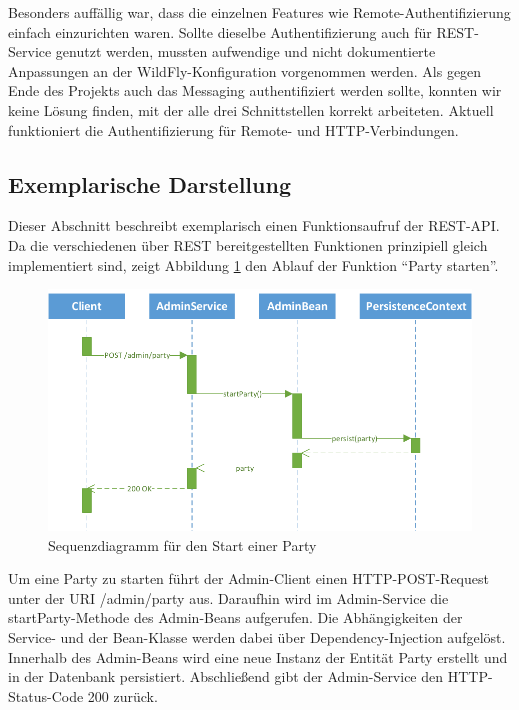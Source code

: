 Besonders auffällig war, dass die einzelnen Features wie Remote-Authentifizierung einfach einzurichten waren. Sollte dieselbe Authentifizierung auch für REST-Service genutzt werden, mussten aufwendige und nicht dokumentierte Anpassungen an der WildFly-Konfiguration vorgenommen werden. Als gegen Ende des Projekts auch das Messaging authentifiziert werden sollte, konnten wir keine Lösung finden, mit der alle drei Schnittstellen korrekt arbeiteten. Aktuell funktioniert die Authentifizierung für Remote- und HTTP-Verbindungen. 


\subsection{Exemplarische Darstellung}
Dieser Abschnitt beschreibt exemplarisch einen Funktionsaufruf der REST-API. Da die verschiedenen über REST bereitgestellten Funktionen prinzipiell gleich implementiert sind, zeigt Abbildung \ref{fig:AufrufSequenz} den Ablauf der Funktion "`Party starten"'.

\begin{figure}[tbh]
\centering
\includegraphics[width=1.0\linewidth]{Bilder/AufrufSequenz}
\caption{Sequenzdiagramm für den Start einer Party}
\label{fig:AufrufSequenz}
\end{figure}

Um eine Party zu starten führt der Admin-Client einen HTTP-POST-Request unter der URI /admin/party aus. Daraufhin wird im Admin-Service die startParty-Methode des Admin-Beans aufgerufen. Die Abhängigkeiten der Service- und der Bean-Klasse werden dabei über Dependency-Injection aufgelöst. Innerhalb des Admin-Beans wird eine neue Instanz der Entität Party erstellt und in der Datenbank persistiert. Abschließend gibt der Admin-Service den HTTP-Status-Code 200 zurück.